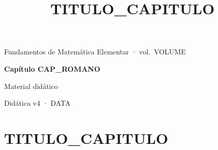 \documentclass[11pt,twoside,openany]{book}
\title{{{TITULO_CAPITULO}}}
\begin{document}
\frontmatter
\begin{titlepage}
  \centering\sffamily
  \vspace*{5cm}
  {\color{cinza}\large Fundamentos de Matemática Elementar · vol.~{{VOLUME}}\par}
  \vspace{1.2em}
  {\color{acento}\Huge\bfseries Capítulo {{CAP_ROMANO}}\par{}\par}
  \vspace{2em}
  {\large Material didático\par}
  \vfill
  {\small\color{cinza}Didática v4 · {{DATA}}\par}
\end{titlepage}
\tableofcontents

\mainmatter
{}
\chapter{{{TITULO_CAPITULO}}}

\clearpage


\backmatter

\end{document}
